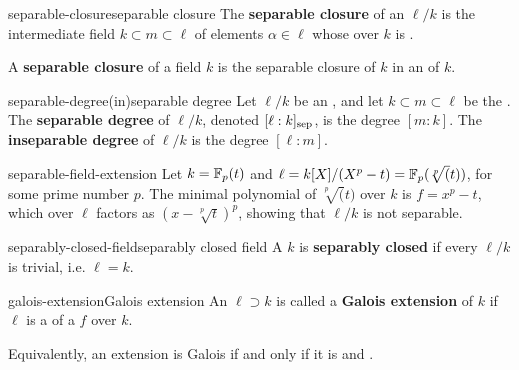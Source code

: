 \begin{topic}{separable-closure}{separable closure}
    The \textbf{separable closure} of an  $\ell/k$ is the intermediate field $k \subset m \subset \ell$ of elements $\alpha \in \ell$ whose  over $k$ is .
    
    A \textbf{separable closure} of a field $k$ is the separable closure of $k$ in an  of $k$.
\end{topic}

\begin{topic}{separable-degree}{(in)separable degree}
    Let $\ell/k$ be an , and let $k \subset m \subset \ell$ be the . The \textbf{separable degree} of $\ell/k$, denoted $[\ell : k]_\textup{sep}$, is the degree $[m : k]$. The \textbf{inseparable degree} of $\ell/k$ is the degree $[\ell : m]$.
\end{topic}

\begin{example}{separable-field-extension}
    Let $k = \mathbb{F}_p(t)$ and $\ell = k[X] / (X^p - t) = \mathbb{F}_p(\sqrt[p](t))$, for some prime number $p$. The minimal polynomial of $\sqrt[p](t)$ over $k$ is $f = x^p - t$, which over $\ell$ factors as $(x - \sqrt[p]{t})^p$, showing that $\ell/k$ is not separable.
\end{example}

\begin{topic}{separably-closed-field}{separably closed field}
    A  $k$ is \textbf{separably closed} if every  $\ell/k$ is trivial, i.e. $\ell = k$.
\end{topic}

\begin{topic}{galois-extension}{Galois extension}
    An   $\ell \supset k$ is called a \textbf{Galois extension} of $k$ if $\ell$ is a  of a  $f$ over $k$.
    
    Equivalently, an extension is Galois if and only if it is  and .
\end{topic}

